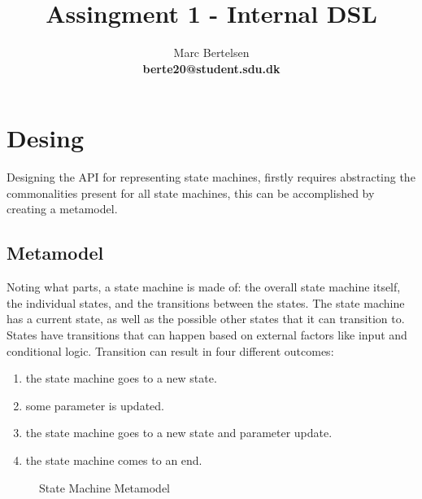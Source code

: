 \documentclass{article}
\begin{document}
\title{Assingment 1 - Internal DSL}
\author{Marc Bertelsen\\
\textbf{berte20@student.sdu.dk}}

\maketitle

\pagebreak

\section{Desing}

Designing the API for representing state machines, firstly requires abstracting the commonalities present for all state machines, this can be accomplished by creating a metamodel.

\subsection{Metamodel}

Noting what parts, a state machine is made of: the overall state machine itself, the individual states, and the transitions between the states. The state machine has a current state, as well as the possible other states that it can transition to. States have transitions that can happen based on external factors like input and conditional logic. Transition can result in four different outcomes:

\begin{enumerate}
    \item the state machine goes to a new state.
    \item some parameter is updated.
    \item the state machine goes to a new state and parameter update.
    \item the state machine comes to an end.
\end{enumerate}

\begin{figure}[H]
    \centering
    \caption{State Machine Metamodel}
\end{figure}
\end{document}
